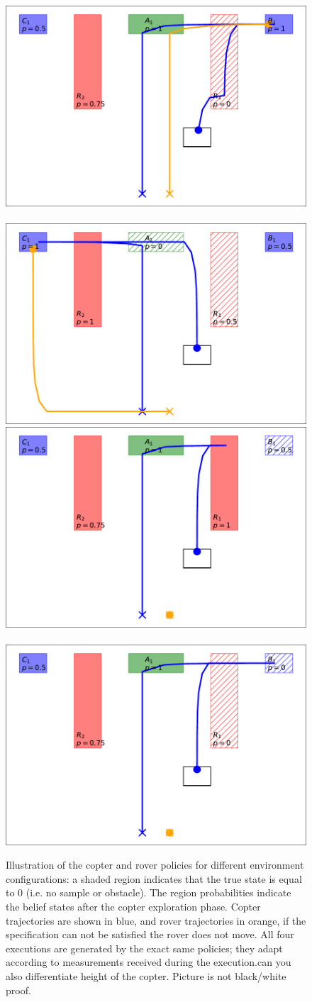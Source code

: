 \documentclass[draft,conference]{IEEEtran}
\newcommand{\sofie}[1]{{\color{orange}#1}}
\begin{document}
\begin{figure}
	\begin{center}
	\includegraphics[width=0.4\columnwidth]{2figs/exp0-map.pdf} ~ 
	\includegraphics[width=0.4\columnwidth]{2figs/exp1-map.pdf} \\
	\vspace{1mm} 
	\includegraphics[width=0.4\columnwidth]{2figs/exp2-map.pdf} ~ 
	\includegraphics[width=0.4\columnwidth]{2figs/exp3-map.pdf}
	\end{center}
	\caption{Illustration of the copter and rover policies for different environment configurations: a shaded region indicates that the true state is equal to 0 (i.e. no sample or obstacle). The region probabilities indicate the belief states after the copter exploration phase. Copter trajectories are shown in blue, and rover trajectories in orange, if the specification can not be satisfied the rover does not move. All four executions are generated by the exact same policies; they adapt according to measurements received during the execution.\sofie{can you also differentiate height of the copter. Picture is not black/white proof. } }
	\label{fig:copter_executions}
\end{figure}
\end{document}
